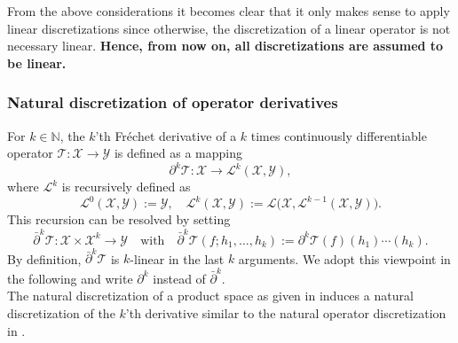 \documentclass[a4paper]{paper}
\newcommand{\Spc}[1]{\mathscr{#1}}
\newcommand{\Natural}{\mathbb{N}}
\newcommand{\Op}[1]{\mathcal{#1}}
\begin{document}
\begin{remark}
 From the above considerations it becomes clear that it only makes sense to apply linear discretizations since 
 otherwise, the discretization of a linear operator is not necessary linear. \textbf{Hence, from now on, all 
 discretizations are assumed to be linear.}
\end{remark}


\subsubsection{Natural discretization of operator derivatives}

For $k \in \Natural$, the $k$'th Fr\'{e}chet derivative of a $k$ times continuously differentiable operator 
$\Op{T} \colon \Spc{X} \to \Spc{Y}$ is defined as a mapping
%
\begin{equation*}
 \partial^k \Op{T} \colon \Spc{X} \to \Spc{L}^k(\Spc{X}, \Spc{Y}),
\end{equation*}
%
where $\Spc{L}^k$ is recursively defined as 
%
\begin{equation*}
 \Spc{L}^0(\Spc{X}, \Spc{Y}) := \Spc{Y}, \quad 
 \Spc{L}^k(\Spc{X}, \Spc{Y}) := \Spc{L}\big( \Spc{X}, \Spc{L}^{k-1}(\Spc{X}, \Spc{Y}) \big).
\end{equation*}
%
This recursion can be resolved by setting
%
\begin{equation*}
 \bar\partial^k \Op{T} \colon \Spc{X} \times \Spc{X}^k \to \Spc{Y}
 \quad \text{with} \quad
 \bar\partial^k \Op{T}(f; h_1, \ldots, h_k) := \partial^k\Op{T}(f)(h_1)\cdots(h_k).
\end{equation*}
%
By definition, $\bar\partial^k\Op{T}$ is $k$-linear in the last $k$ arguments. We adopt this viewpoint in the following 
and write $\partial^k$ instead of $\bar\partial^k$.\\
%
The natural discretization of a product space as given in  induces a natural 
discretization of the $k$'th derivative similar to the natural operator discretization in 
.
\end{document}
